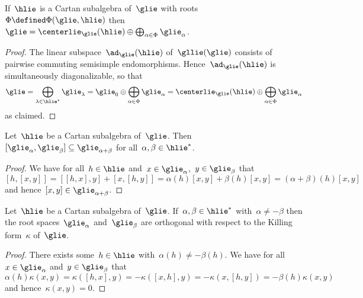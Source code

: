 \begin{lemma}
  \label{pre root space decomposition}
  If~$\hlie$ is a Cartan subalgebra of~$\glie$ with roots~$\Phi \defined \Phi(\glie, \hlie)$ then~$\glie = \centerlie_{\glie}(\hlie) \oplus \bigoplus_{\alpha \in \Phi} \glie_\alpha$.
\end{lemma}


\begin{proof}
  The linear subspace~$\ad_{\glie}(\hlie)$ of~$\gllie(\glie)$ consists of pairwise commuting semisimple endomorphisms.
  Hence~$\ad_{\glie}(\hlie)$ is simultaneously diagonalizable, so that
  \[
    \glie
    =
    \bigoplus_{\lambda \in \hlie^*} \glie_\lambda
    =
    \glie_0
    \oplus
    \bigoplus_{\alpha \in \Phi} \glie_\alpha
    =
    \centerlie_{\glie}(\hlie)
    \oplus
    \bigoplus_{\alpha \in \Phi} \glie_\alpha
  \]
  as claimed.
\end{proof}




\begin{lemma}
  Let~$\hlie$ be a Cartan subalgebra of~$\glie$.
  Then~$[\glie_\alpha, \glie_\beta] \subseteq \glie_{\alpha+\beta}$ for all~$\alpha, \beta \in \hlie^*$.
\end{lemma}


\begin{proof}
  We have for all~$h \in \hlie$ and~$x \in \glie_\alpha$,~$y \in \glie_\beta$ that
  \[
    [h,[x,y]]
    =
    [[h,x],y] + [x,[h,y]]
    =
    \alpha(h)[x,y] + \beta(h)[x,y]
    =
    (\alpha+\beta)(h) [x,y]
  \]
  and hence~$[x,y] \in \glie_{\alpha+\beta}$.
\end{proof}


\begin{lemma}
  \label{root spaces orthogonal with respect to killing form}
  Let~$\hlie$ be a Cartan subalgebra of~$\glie$.
  If~$\alpha, \beta \in \hlie^*$ with~$\alpha \neq -\beta$ then the root spaces~$\glie_\alpha$ and~$\glie_\beta$ are orthogonal with respect to the Killing form~$\kappa$ of~$\glie$.
\end{lemma}


\begin{proof}
 There exists some~$h \in \hlie$ with~$\alpha(h) \neq -\beta(h)$.
 We have for all~$x \in \glie_\alpha$ and~$y \in \glie_\beta$ that
 \[
  \alpha(h) \kappa(x,y)
  =
  \kappa([h,x],y)
  =
  -\kappa([x,h],y)
  =
  -\kappa(x,[h,y])
  =
  -\beta(h) \kappa(x,y)
 \]
 and hence~$\kappa(x,y) = 0$.
\end{proof}


